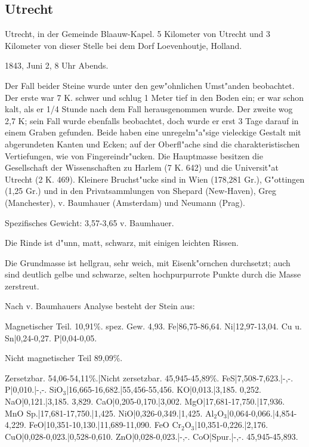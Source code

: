 \documentclass[a4paper, 11pt, oneside]{article}
\begin{document}
\subsection{Utrecht}

Utrecht, in der Gemeinde Blaauw-Kapel. 5 Kilometer von Utrecht und 3 Kilometer von dieser Stelle bei dem Dorf Loevenhoutje, Holland.

1843, Juni 2, 8 Uhr Abends.

Der Fall beider Steine wurde unter den gew"ohnlichen Umst"anden beobachtet. Der erste war 7 K. schwer und schlug 1 Meter tief in den Boden ein; er war schon kalt, als er 1/4 Stunde nach dem Fall herausgenommen wurde. Der zweite wog 2,7 K; sein Fall wurde ebenfalls beobachtet, doch wurde er erst 3 Tage darauf in einem Graben gefunden. Beide haben eine unregelm"a"sige vieleckige Gestalt mit abgerundeten Kanten und Ecken; auf der Oberfl"ache sind die charakteristischen Vertiefungen, wie von Fingereindr"ucken. Die Hauptmasse besitzen die Gesellschaft der Wissenschaften zu Harlem (7 K. 642) und die Universit"at Utrecht (2 K. 469). Kleinere Bruchst"ucke sind in Wien (178,281 Gr.), G"ottingen (1,25 Gr.) und in den Privatsammlungen von Shepard (New-Haven), Greg (Manchester), v. Baumhauer (Amsterdam) und Neumann (Prag).

Spezifisches Gewicht: 3,57-3,65 v. Baumhauer.

Die Rinde ist d"unn, matt, schwarz, mit einigen leichten Rissen.

Die Grundmasse ist hellgrau, sehr weich, mit Eisenk"ornchen durchsetzt; auch sind deutlich gelbe und schwarze, selten hochpurpurrote Punkte durch die Masse zerstreut.

Nach v. Baumhauers Analyse besteht der Stein aus:

Magnetischer Teil. 10,91\%. spez. Gew. 4,93.  
Fe|86,75-86,64.  
Ni|12,97-13,04.  
Cu u. Sn|0,24-0,27.  
P|0,04-0,05.

Nicht magnetischer Teil 89,09\%.

Zersetzbar. 54,06-54,11\%.|Nicht zersetzbar. 45,945-45,89\%.  
FeS|7,508-7,623.|-,-.  
P|0,010.|-,-.  
SiO$_{3}$|16,665-16,682.|55,456-55,456.  
KO|0,013.|3,185. 0,252.  
NaO|0,121.|3,185. 3,829.  
CaO|0,205-0,170.|3,002.  
MgO|17,681-17,750.|17,936.  
MnO Sp.|17,681-17,750.|1,425.  
NiO|0,326-0,349.|1,425.  
Al$_{2}$O$_{3}$|0,064-0,066.|4,854-4,229.  
FeO|10,351-10,130.|11,689-11,090.  
FeO Cr$_{2}$O$_{3}$|10,351-0,226.|2,176.  
CuO|0,028-0,023.|0,528-0,610.  
ZnO|0,028-0,023.|-,-.  
CoO|Spur.|-,-.  
45,945-45,893.  
\end{document}
